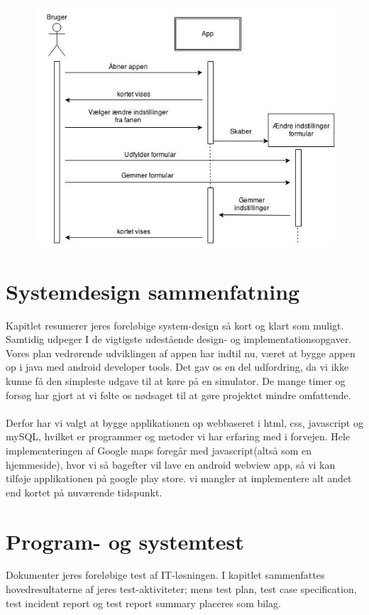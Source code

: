 \documentclass[12pt]{article}
\begin{document}
\begin{figure}[h]
\includegraphics[scale = 0.4]{indstillinger}
\end{figure}


\pagebreak

\section{Systemdesign sammenfatning}
Kapitlet resumerer jeres foreløbige system-design så kort og klart som muligt. Samtidig
udpeger I de vigtigste udestående design- og implementationsopgaver.\\

Vores plan vedrørende udviklingen af appen har indtil nu, været at bygge appen op i java med android developer tools. Det gav os en del udfordring, da vi ikke kunne få den simpleste udgave til at køre på en simulator. De mange timer og forsøg har gjort at vi følte os nødsaget til at gøre projektet mindre omfattende. 
\\\\
Derfor har vi valgt at bygge applikationen op webbaseret i html, css, javascript og mySQL, hvilket er programmer og metoder vi har erfaring med i forvejen. 
Hele implementeringen af Google maps foregår med javascript(altså som en hjemmeside), hvor vi så bagefter vil lave en android webview app, så vi kan tilføje applikationen på google play store. vi mangler at implementere alt andet end kortet på nuværende tidspunkt.

\section{Program- og systemtest}
Dokumenter jeres foreløbige test af IT-løsningen. I kapitlet sammenfattes hovedresultaterne af
jeres test-aktiviteter; mens test plan, test case specification, test incident report og test report
summary placeres som bilag.
\end{document}
